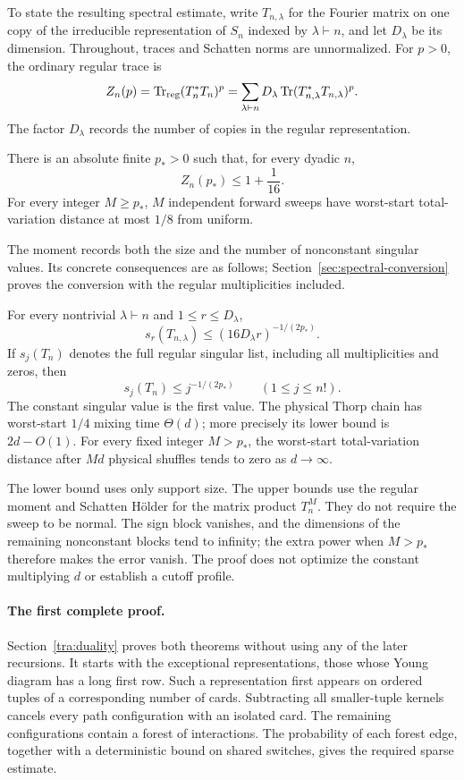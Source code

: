 To state the resulting spectral estimate, write $T_{n,\lambda}$ for the Fourier matrix on one copy of the irreducible representation of $S_n$ indexed by $\lambda\vdash n$, and let $D_\lambda$ be its dimension. Throughout, traces and Schatten norms are unnormalized. For $p>0$, the ordinary regular trace is
\[
 Z_n(p)=\operatorname{Tr}_{\mathrm{reg}}(T_n^*T_n)^p
       =\sum_{\lambda\vdash n}D_\lambda
                 \operatorname{Tr}(T_{n,\lambda}^*T_{n,\lambda})^p.
\]
The factor $D_\lambda$ records the number of copies in the regular representation.
\begin{theorem}\label{tra:duality:moment}
There is an absolute finite $p_*>0$ such that, for every dyadic $n$,
\begin{equation}\label{tra:duality:eq7}
 Z_n(p_*)\le1+\frac1{16}.
\end{equation}
For every integer $M\ge p_*$, $M$ independent forward sweeps have worst-start total-variation distance at most $1/8$ from uniform.
\end{theorem}
The moment records both the size and the number of nonconstant singular values. Its concrete consequences are as follows; Section~\ref{sec:spectral-conversion} proves the conversion with the regular multiplicities included.
\begin{corollary}\label{cor:intro-consequences}
For every nontrivial $\lambda\vdash n$ and $1\le r\le D_\lambda$,
\[
 s_r(T_{n,\lambda})\le(16D_\lambda r)^{-1/(2p_*)}.
\]
If $s_j(T_n)$ denotes the full regular singular list, including all multiplicities and zeros, then
\[
 s_j(T_n)\le j^{-1/(2p_*)}\qquad(1\le j\le n!).
\]
The constant singular value is the first value. The physical Thorp chain has worst-start $1/4$ mixing time $\Theta(d)$; more precisely its lower bound is $2d-O(1)$. For every fixed integer $M>p_*$, the worst-start total-variation distance after $Md$ physical shuffles tends to zero as $d\to\infty$.
\end{corollary}
The lower bound uses only support size. The upper bounds use the regular moment and Schatten H\"older for the matrix product $T_n^M$. They do not require the sweep to be normal. The sign block vanishes, and the dimensions of the remaining nonconstant blocks tend to infinity; the extra power when $M>p_*$ therefore makes the error vanish. The proof does not optimize the constant multiplying $d$ or establish a cutoff profile.

\paragraph{The first complete proof.}
Section~\ref{tra:duality} proves both theorems without using any of the later recursions. It starts with the exceptional representations, those whose Young diagram has a long first row. Such a representation first appears on ordered tuples of a corresponding number of cards. Subtracting all smaller-tuple kernels cancels every path configuration with an isolated card. The remaining configurations contain a forest of interactions. The probability of each forest edge, together with a deterministic bound on shared switches, gives the required sparse estimate.

